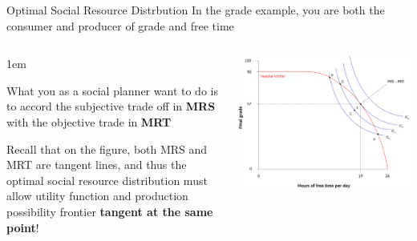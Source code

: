 \documentclass[11pt,aspectratio=43,usenames,dvipsnames]{beamer}
\let\olditemize=\itemize
\let\endolditemize=\enditemize
\renewenvironment{itemize}{\olditemize \itemsep1em}{\endolditemize}
\theoremstyle{definition}
\begin{document}
\begin{frame}{Optimal Social Resource Distrbution}
\label{slide:Constrained_Choice_Problem}
    In the grade example, you are both the \alert{consumer} and \alert{producer} of grade and free time
    \begin{columns}
        \begin{column}{0.5\textwidth}
            \begin{itemize}
                \item What you as a \alert{social planner} want to do is to accord the \alert{subjective} trade off in \textbf{MRS} with the \alert{objective} trade in \textbf{MRT}
                \item Recall that on the figure, both MRS and MRT are \alert{tangent lines}, and thus the \alert{optimal social resource distribution} must allow utility function and production possibility frontier \textbf{tangent at the same point}!
            \end{itemize}
        \end{column}
        \begin{column}{0.5\textwidth}
            \includegraphics[width=\textwidth]{./figures/MRSMRT.png}
        \end{column}
    \end{columns}

\end{frame}
\end{document}
